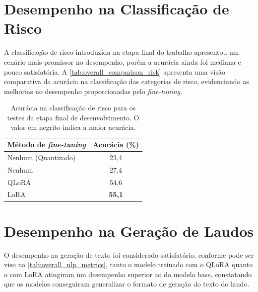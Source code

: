 \section{Desempenho na Classificação de Risco}

A classificação de risco introduzida na etapa final do trabalho apresentou um cenário mais promissor no desempenho,
porém a acurácia ainda foi mediana e pouco satisfatória. A \autoref{tab:overall_comparison_risk} apresenta uma visão
comparativa da acurácia na classificação das categorias de risco, evidenciando as melhorias no desempenho
proporcionadas pelo \textit{fine-tuning}.

\begin{table}[ht]
    \caption{\small Acurácia na classificação de risco para os testes da etapa final de desenvolvimento. O valor em
    negrito indica a maior acurácia.}
    \centering
    \begin{tabular}{l|c}
        \hline
        Método de \textit{fine-tuning} & Acurácia (\%) \\ \hline
        Nenhum (Quantizado)            & 23,4          \\
        Nenhum                         & 27,4          \\
        \ac{QLoRA}                     & 54,6          \\
        \ac{LoRA}                      & \textbf{55,1} \\ \hline
    \end{tabular}
    \label{tab:overall_comparison_risk}
\end{table}

\section{Desempenho na Geração de Laudos}

O desempenho na geração de texto foi considerado satisfatório, conforme pode ser viso na
\autoref{tab:overall_nlp_metrics}, tanto o modelo treinado com o \ac{QLoRA} quanto o com \ac{LoRA} atingiram um
desempenho superior ao do modelo base, constatando que os modelos conseguiram generalizar o formato de geração do texto
do laudo.

